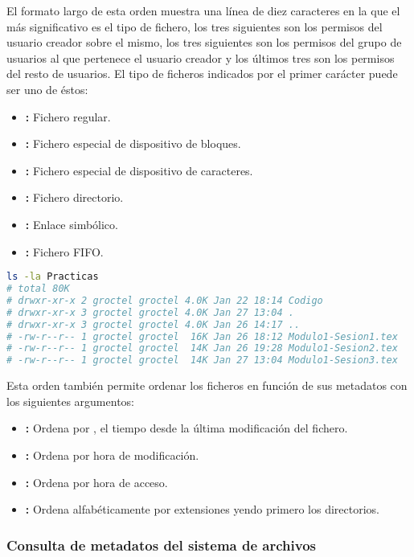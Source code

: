 El formato largo de esta orden muestra una línea de diez caracteres en la que el más significativo es el tipo de fichero, los tres siguientes son los permisos del usuario creador sobre el mismo, los tres siguientes son los permisos del grupo de usuarios al que pertenece el usuario creador y los últimos tres son los permisos del resto de usuarios.
El tipo de ficheros indicados por el primer carácter puede ser uno de éstos:

\begin{itemize}
	\item\code{-}\textbf{:} Fichero regular.
	\item{}\textbf{:} Fichero especial de dispositivo de bloques.
	\item{}\textbf{:} Fichero especial de dispositivo de caracteres.
	\item{}\textbf{:} Fichero directorio.
	\item{}\textbf{:} Enlace simbólico.
	\item{}\textbf{:} Fichero FIFO\@.
\end{itemize}

\begin{lstlisting}[language=Bash]
ls -la Practicas
# total 80K
# drwxr-xr-x 2 groctel groctel 4.0K Jan 22 18:14 Codigo
# drwxr-xr-x 3 groctel groctel 4.0K Jan 27 13:04 .
# drwxr-xr-x 3 groctel groctel 4.0K Jan 26 14:17 ..
# -rw-r--r-- 1 groctel groctel  16K Jan 26 18:12 Modulo1-Sesion1.tex
# -rw-r--r-- 1 groctel groctel  14K Jan 26 19:28 Modulo1-Sesion2.tex
# -rw-r--r-- 1 groctel groctel  14K Jan 27 13:04 Modulo1-Sesion3.tex
\end{lstlisting}

Esta orden también permite ordenar los ficheros en función de sus metadatos con los siguientes argumentos:

\begin{itemize}
	\item{}\textbf{:} Ordena por , el tiempo desde la última modificación del fichero.
	\item{}\textbf{:} Ordena por hora de modificación.
	\item{}\textbf{:} Ordena por hora de acceso.
	\item{}\textbf{:} Ordena alfabéticamente por extensiones yendo primero los directorios.
\end{itemize}

\subsubsection{Consulta de metadatos del sistema de archivos}

